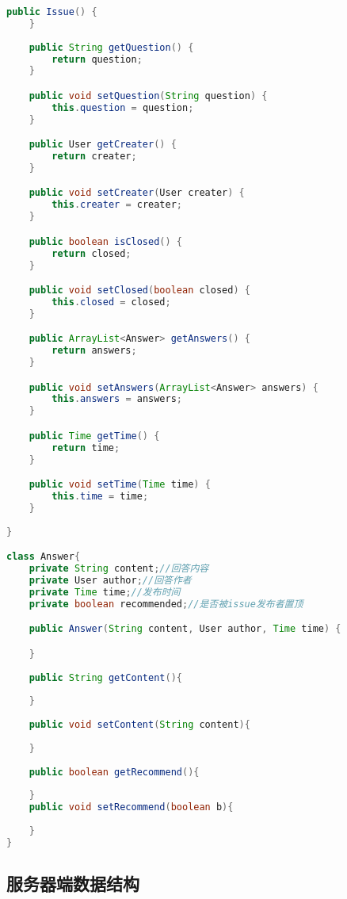 {\begin{lstlisting}[language=Java, caption=Issue定义]
    public Issue() {
    }
    
    public String getQuestion() {
        return question;
    }

    public void setQuestion(String question) {
        this.question = question;
    }

    public User getCreater() {
        return creater;
    }

    public void setCreater(User creater) {
        this.creater = creater;
    }

    public boolean isClosed() {
        return closed;
    }

    public void setClosed(boolean closed) {
        this.closed = closed;
    }

    public ArrayList<Answer> getAnswers() {
        return answers;
    }

    public void setAnswers(ArrayList<Answer> answers) {
        this.answers = answers;
    }

    public Time getTime() {
        return time;
    }

    public void setTime(Time time) {
        this.time = time;
    }
    
}

class Answer{
    private String content;//回答内容
    private User author;//回答作者
    private Time time;//发布时间
    private boolean recommended;//是否被issue发布者置顶

    public Answer(String content, User author, Time time) {

    }
    
    public String getContent(){
    
    }
    
    public void setContent(String content){
    
    }
    
    public boolean getRecommend(){
        
    }
    public void setRecommend(boolean b){
        
    }
}
\end{lstlisting}


}


{\color{red}



\subsection{{\color{red}服务器端数据结构}}
}
